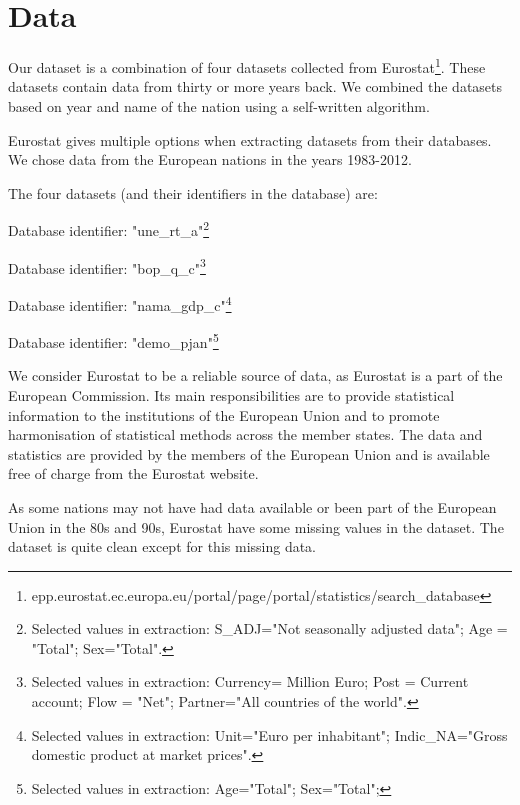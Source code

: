 \section{Data}
\label{DataSets}
Our dataset is a combination of four datasets collected from Eurostat\footnote{epp.eurostat.ec.europa.eu/portal/page/portal/statistics/search\_database}. These datasets contain data from thirty or more years back. We combined the datasets based on year and name of the nation using a self-written algorithm. 

Eurostat gives multiple options when extracting datasets from their databases. We chose data from the European nations in the years 1983-2012.

The four datasets (and their identifiers in the database) are:
\begin{my_description}
\item[Unemployment rate] Database identifier: "une\_rt\_a"\footnote{Selected values in extraction: S\_ADJ="Not seasonally adjusted data"; Age = "Total"; Sex="Total".}
\item[Balance of payments]Database identifier: "bop\_q\_c"\footnote{Selected values in extraction: Currency= Million Euro; Post = Current account; Flow = "Net"; Partner="All countries of the world".}
\item[GDP per inhabitant]Database identifier: "nama\_gdp\_c"\footnote{Selected values in extraction: Unit="Euro per inhabitant"; Indic\_NA="Gross domestic product at market prices".}
\item[Population]Database identifier: "demo\_pjan"\footnote{Selected values in extraction: Age="Total"; Sex="Total";}
\end{my_description}

We consider Eurostat to be a reliable source of data, as Eurostat is a part of the European Commission. Its main responsibilities are to provide statistical information to the institutions of the European Union and to promote harmonisation of statistical methods across the member states. The data and statistics are provided by the members of the European Union and is available free of charge from the Eurostat website.

As some nations may not have had data available or been part of the European Union in the 80s and 90s, Eurostat have some missing values in the dataset. The dataset is quite clean except for this missing data.
